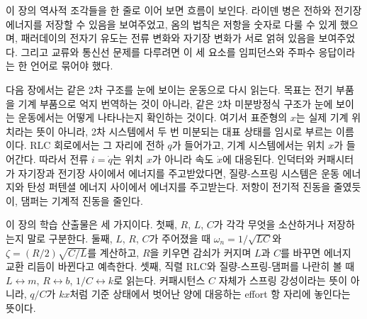 이 장의 역사적 조각들을 한 줄로 이어 보면 흐름이 보인다.
라이덴 병은 전하와 전기장 에너지를 저장할 수 있음을 보여주었고, 옴의 법칙은 저항을 숫자로 다룰 수 있게 했으며, 패러데이의 전자기 유도는 전류 변화와 자기장 변화가 서로 얽혀 있음을 보여주었다.
그리고 교류와 통신선 문제를 다루려면 이 세 요소를 임피던스와 주파수 응답이라는 한 언어로 묶어야 했다.

다음 장에서는 같은 2차 구조를 눈에 보이는 운동으로 다시 읽는다.
목표는 전기 부품을 기계 부품으로 억지 번역하는 것이 아니라, 같은 2차 미분방정식 구조가 눈에 보이는 운동에서는 어떻게 나타나는지 확인하는 것이다.
여기서 표준형의 $x$는 실제 기계 위치라는 뜻이 아니라, 2차 시스템에서 두 번 미분되는 대표 상태를 임시로 부르는 이름이다.
RLC 회로에서는 그 자리에 전하 $q$가 들어가고, 기계 시스템에서는 위치 $x$가 들어간다.
따라서 전류 $i=\dot{q}$는 위치 $x$가 아니라 속도 $\dot{x}$에 대응된다.
인덕터와 커패시터가 자기장과 전기장 사이에서 에너지를 주고받았다면, 질량-스프링 시스템은 운동 에너지와 탄성 퍼텐셜 에너지 사이에서 에너지를 주고받는다.
저항이 전기적 진동을 줄였듯이, 댐퍼는 기계적 진동을 줄인다.

이 장의 학습 산출물은 세 가지이다.
첫째, $R$, $L$, $C$가 각각 무엇을 소산하거나 저장하는지 말로 구분한다.
둘째, $L$, $R$, $C$가 주어졌을 때 $\omega_n=1/\sqrt{LC}$와 $\zeta=(R/2)\sqrt{C/L}$를 계산하고, $R$을 키우면 감쇠가 커지며 $L$과 $C$를 바꾸면 에너지 교환 리듬이 바뀐다고 예측한다.
셋째, 직렬 RLC와 질량-스프링-댐퍼를 나란히 볼 때 $L\leftrightarrow m$, $R\leftrightarrow b$, $1/C\leftrightarrow k$로 읽는다.
커패시턴스 $C$ 자체가 스프링 강성이라는 뜻이 아니라, $q/C$가 $kx$처럼 기준 상태에서 벗어난 양에 대응하는 effort 항 자리에 놓인다는 뜻이다.
